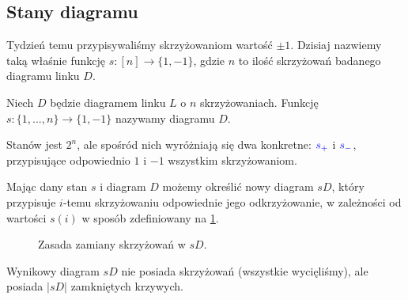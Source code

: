\documentclass{article}
\begin{document}
\subsection{Stany diagramu}

Tydzień temu przypisywaliśmy skrzyżowaniom wartość $\pm1$. Dzisiaj nazwiemy taką właśnie funkcję $s:[n]\to \{1, -1\}$, gdzie $n$ to ilość skrzyżowań badanego diagramu linku $D$.

\begin{deff}
  Niech $D$ będzie diagramem linku $L$ o $n$ skrzyżowaniach. Funkcję $s:\{1,..., n\}\to \{1, -1\}$ nazywamy  diagramu $D$.
\end{deff}

Stanów jest $2^n$, ale spośród nich wyróżniają się dwa konkretne: $\color{blue}s_+$ i $\color{blue}s_-$, przypisujące odpowiednio $1$ i $-1$ wszystkim skrzyżowaniom.

Mając dany stan $s$ i diagram $D$ możemy określić nowy diagram $sD$, który przypisuje $i$-temu skrzyżowaniu odpowiednie jego odkrzyżowanie, w zależności od wartości $s(i)$ w sposób zdefiniowany na \cref{stan od diagramu}. 

\begin{figure}[h]\centering 
  \caption{\label{stan od diagramu}Zasada zamiany skrzyżowań w $sD$.}
\end{figure}
Wynikowy diagram $sD$ nie posiada skrzyżowań (wszystkie wycięliśmy), ale posiada $|sD|$ zamkniętych krzywych. 
\end{document}
